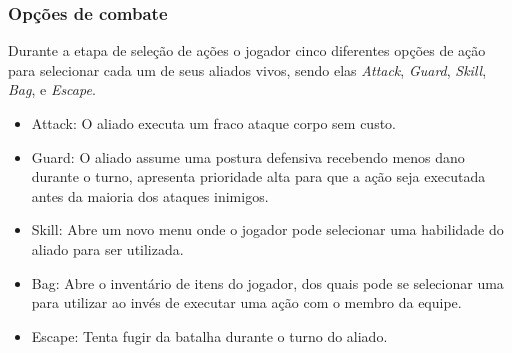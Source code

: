 \documentclass[
	12pt,				%
	openright,			%
	twoside,			%
	a4paper,			%
	english,			%
	french,				%
	spanish,			%
	brazil				%
	]{abntex2}
\begin{document}
\subsubsection{Opções de combate}

Durante a etapa de seleção de ações o jogador cinco diferentes opções de ação para selecionar cada um de seus aliados vivos, sendo elas \emph{Attack}, \emph{Guard}, \emph{Skill}, \emph{Bag}, e \emph{Escape}.

\begin{itemize}

\item Attack: O aliado executa um fraco ataque corpo sem custo.
\item Guard: O aliado assume uma postura defensiva recebendo menos dano durante o turno, apresenta prioridade alta para que a ação seja executada antes da maioria dos ataques inimigos.
\item Skill: Abre um novo menu onde o jogador pode selecionar uma habilidade do aliado para ser utilizada.
\item Bag: Abre o inventário de itens do jogador, dos quais pode se selecionar uma para utilizar ao invés de executar uma ação com o membro da equipe.
\item Escape: Tenta fugir da batalha durante o turno do aliado.

\end{itemize}
\end{document}
